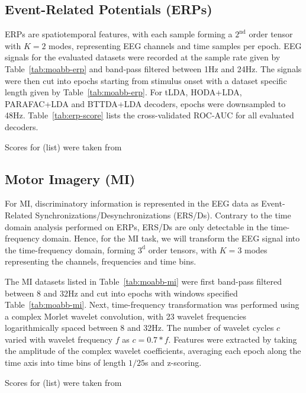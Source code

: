 \documentclass[twocolumn]{article}
\begin{document}
\subsection{Event-Related Potentials (ERPs)}
ERPs are spatiotemporal features, with each sample forming a $2^\text{nd}$
order tensor with $K=2$ modes, representing EEG channels and time samples
per epoch.
EEG signals for the evaluated datasets were recorded at the sample rate given
by Table~\ref{tab:moabb-erp} and band-pass filtered between 1Hz
and 24Hz.
The signals were then cut into epochs starting from stimulus onset with a
dataset specific length given by Table~\ref{tab:moabb-erp}.
For tLDA, HODA+LDA, PARAFAC+LDA and BTTDA+LDA decoders, epochs were downsampled to 48Hz.
Table~\ref{tab:erp-score} lists the cross-validated ROC-AUC for all evaluated
decoders.
\begin{table*}
  \footnotesize
  
  \caption{Scores for (list) were taken from \cite{Chevallier2024}}
  \label{tab:erp-score}
\end{table*}


\subsection{Motor Imagery (MI)}
For MI, discriminatory information is represented in the EEG data as
Event-Related Synchronizations/Desynchronizations (ERS/Ds).
Contrary to the time domain analysis performed on ERPs, ERS/Ds are only
detectable in the time-frequency domain.
Hence, for the MI task, we will transform the EEG signal into the
time-frequency domain, forming $3^\text{d}$ order tensors, with $K=3$ modes
representing the channels, frequencies and time bins.

The MI datasets listed in Table~\ref{tab:moabb-mi} were first band-pass filtered between 8 and 32Hz and cut into
epochs with windows specified Table~\ref{tab:moabb-mi}.
Next, time-frequency transformation was performed using a complex Morlet wavelet
convolution, with 23 wavelet frequencies logarithmically spaced between 8 and
32Hz.
The number of wavelet cycles $c$ varied with wavelet frequency $f$ as
$c=0.7*f$.
Features were extracted by taking the amplitude of the complex wavelet
coefficients, averaging each epoch along the time axis into time bins of
length $1/25$s and z-scoring.


\begin{table*}
  \footnotesize
  
  \caption{Scores for (list) were taken from \cite{Chevallier2024}}
  \label{tab:mi-score}
\end{table*}
\end{document}
